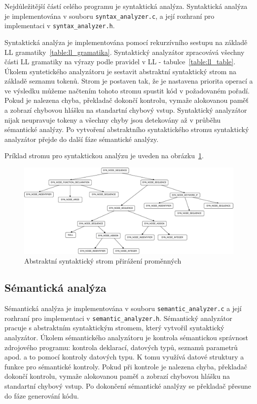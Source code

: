 \documentclass[a4paper, 11pt]{article}
\begin{document}
	Nejdůležitější částí celého programu je syntaktická analýza. Syntaktická analýza je implementována v souboru
	\texttt{syntax\_analyzer.c}, a její rozhraní pro implementaci v \texttt{syntax\_analyzer.h}.

	Syntaktická analýza je implementována pomocí rekurzívního sestupu na základě LL gramatiky~\ref{table:ll_gramatika}. Syntaktický
	analyzátor zpracovává všechny části LL gramatiky na výrazy podle pravidel v LL - tabulce~\ref{table:ll_table}. Úkolem
	syntetického analyzátoru je sestavit abstraktní syntaktický strom na základě seznamu tokenů. Strom je postaven
	tak, že je nastavena priorita operací a ve výsledku můžeme načtením tohoto stromu spustit kód v
	požadovaném pořadí. Pokud je nalezena chyba, překladač dokončí kontrolu, vymaže alokovanou paměť
	a zobrazí chybovou hlášku na standartní chybový vstup. Syntaktický analyzátor nijak neupravuje tokeny a všechny
	chyby jsou detekovány až v průběhu sémantické analýzy. Po vytvoření abstraktního syntaktického stromu
	syntaktický analyzátor přejde do další fáze sémantické analýzy.

	Príklad stromu pro syntaktickou analýzu je uveden na obrázku~\ref{figure:ast_example}.

	\newpage

	\begin{figure}[!ht]
		\centering
		\includegraphics[width=1\linewidth]{ast.pdf}
		\caption{Abstraktní syntaktický strom přirážení proměnných}
		\label{figure:ast_example}
	\end{figure}

	\subsection{Sémantická analýza}
	Sémantická analýza je implementována v souboru \texttt{semantic\_analyzer.c} a její rozhraní pro implementaci
	v \texttt{semantic\_analyzer.h}. Sémantický analyzátor pracuje s abstraktním syntaktickým stromem, který
	vytvořil syntaktický analyzátor. Úkolem sémantického analyzátoru je kontrola sémantickou správnost zdrojového
	programu: kontrola deklarací, datových typů, seznamů parametrů apod. a to pomocí kontroly datových typu. K
	tomu využívá datové struktury a funkce pro sémantické kontroly. Pokud při kontrole je nalezena chyba, překladač dokončí
	kontrolu, vymaže alokovanou paměť a zobrazí chybovou hlášku na standartní chybový vstup. Po dokončení
	sémantické analýzy se překladač přesune do fáze generování kódu.
\end{document}
